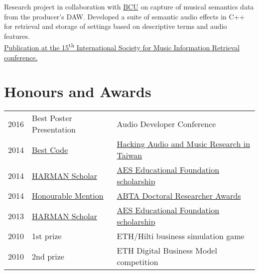 \documentclass[letterpaper]{deedy-resume} %
\begin{document}
{\begin{minipage}[t]{0.66\textwidth}
\sectionspace %


\hspace{-0.1cm}
Research project in collaboration with \href{http://www.bcu.ac.uk}{BCU} on capture of musical semantics data from the producer's DAW. 
Developed a suite of semantic audio effects in C++ for retrieval and storage of settings based on descriptive terms and audio features. \\
\href{http://www.terasoft.com.tw/conf/ismir2014/LBD/LBD15.pdf}{Publication at the 15\textsuperscript{th} International Society for Music Information Retrieval conference.}



\section{Honours and Awards} 

\begin{tabular}{@{}rll}
2016 & Best Poster Presentation & Audio Developer Conference\\
2014 & \href{http://labrosa.ee.columbia.edu/hamr_ismir2014/proceedings/doku.php?id=intelligent_audio_switch_box}{Best Code} & \href{http://labrosa.ee.columbia.edu/hamr_ismir2014/proceedings/doku.php?id=intelligent_audio_switch_box}{Hacking Audio and Music Research in Taiwan}\\
2014 & \href{http://www.aes.org/education/foundation/awards.cfm}{HARMAN Scholar} & \href{http://www.aes.org/education/foundation/awards.cfm}{AES Educational Foundation scholarship}\\
2014 & \href{http://www.abtanet.org.uk/Awards/Detail/6/2014-ABTA-Doctoral-Researcher-Awards/}{Honourable Mention} & \href{http://www.abtanet.org.uk/Awards/Detail/6/2014-ABTA-Doctoral-Researcher-Awards/}{ABTA Doctoral Researcher Awards} \\
2013 & \href{http://www.aes.org/press/?ID=215}{HARMAN Scholar} & \href{http://www.aes.org/press/?ID=215}{AES Educational Foundation scholarship}\\
2010 & 1st prize & ETH/Hilti business simulation game\\
2010 & 2nd prize & ETH Digital Business Model competition
\end{tabular}


\end{minipage}}
\end{document}
